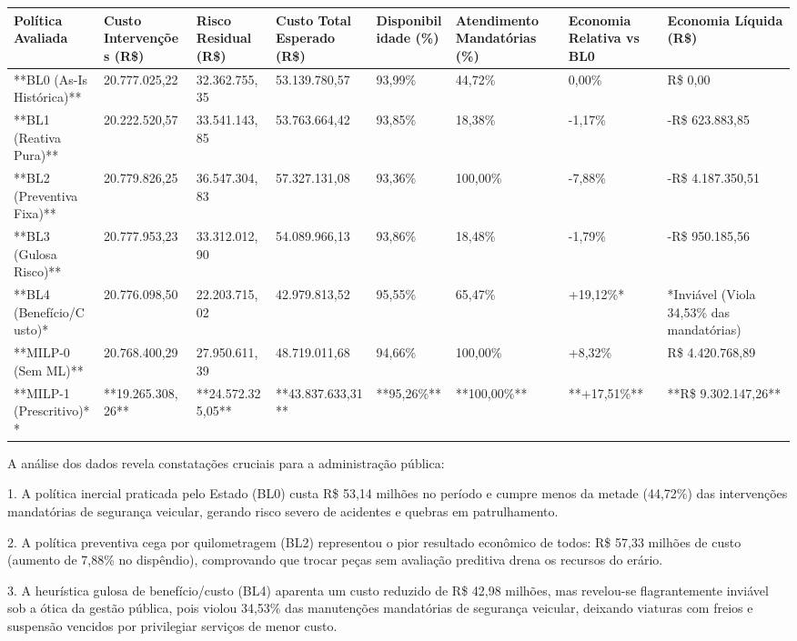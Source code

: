 \documentclass[10pt,a4paper,journal]{article}
\begin{document}
\begin{table}[htbp]
\centering
\small
\begin{tabular}{llllllll}
\toprule
Política Avaliada & Custo Intervenções (R\$) & Risco Residual (R\$) & Custo Total Esperado (R\$) & Disponibilidade (\%) & Atendimento Mandatórias (\%) & Economia Relativa vs BL0 & Economia Líquida (R\$) \\
\midrule
**BL0 (As-Is Histórica)** & 20.777.025,22 & 32.362.755,35 & 53.139.780,57 & 93,99\% & 44,72\% & 0,00\% & R\$ 0,00 \\
**BL1 (Reativa Pura)** & 20.222.520,57 & 33.541.143,85 & 53.763.664,42 & 93,85\% & 18,38\% & -1,17\% & -R\$ 623.883,85 \\
**BL2 (Preventiva Fixa)** & 20.779.826,25 & 36.547.304,83 & 57.327.131,08 & 93,36\% & 100,00\% & -7,88\% & -R\$ 4.187.350,51 \\
**BL3 (Gulosa Risco)** & 20.777.953,23 & 33.312.012,90 & 54.089.966,13 & 93,86\% & 18,48\% & -1,79\% & -R\$ 950.185,56 \\
**BL4 (Benefício/Custo)* & 20.776.098,50 & 22.203.715,02 & 42.979.813,52 & 95,55\% & 65,47\% & +19,12\%* & *Inviável (Viola 34,53\% das mandatórias) \\
**MILP-0 (Sem ML)** & 20.768.400,29 & 27.950.611,39 & 48.719.011,68 & 94,66\% & 100,00\% & +8,32\% & R\$ 4.420.768,89 \\
**MILP-1 (Prescritivo)** & **19.265.308,26** & **24.572.325,05** & **43.837.633,31** & **95,26\%** & **100,00\%** & **+17,51\%** & **R\$ 9.302.147,26** \\
\bottomrule
\end{tabular}
\end{table}
A análise dos dados revela constatações cruciais para a administração pública:

1. A política inercial praticada pelo Estado (BL0) custa R\$ 53,14 milhões no período e cumpre menos da metade (44,72\%) das intervenções mandatórias de segurança veicular, gerando risco severo de acidentes e quebras em patrulhamento.

2. A política preventiva cega por quilometragem (BL2) representou o pior resultado econômico de todos: R\$ 57,33 milhões de custo (aumento de 7,88\% no dispêndio), comprovando que trocar peças sem avaliação preditiva drena os recursos do erário.

3. A heurística gulosa de benefício/custo (BL4) aparenta um custo reduzido de R\$ 42,98 milhões, mas revelou-se flagrantemente inviável sob a ótica da gestão pública, pois violou 34,53\% das manutenções mandatórias de segurança veicular, deixando viaturas com freios e suspensão vencidos por privilegiar serviços de menor custo.
\end{document}
